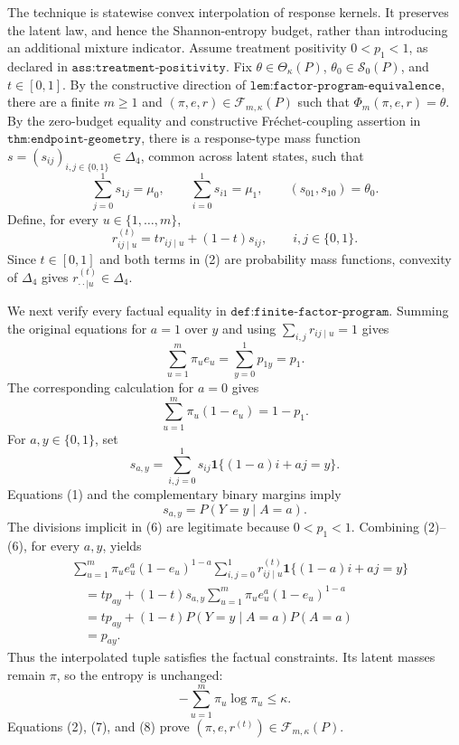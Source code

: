 The technique is statewise convex interpolation of response kernels.  It preserves the latent law, and hence the Shannon-entropy budget, rather than introducing an additional mixture indicator.  Assume treatment positivity \(0<p_1<1\), as declared in \(\texttt{ass:treatment-positivity}\).  Fix \(\theta\in\Theta_\kappa(P)\), \(\theta_0\in\mathcal S_0(P)\), and \(t\in[0,1]\).  By the constructive direction of \(\texttt{lem:factor-program-equivalence}\), there are a finite \(m\geq1\) and \((\pi,e,r)\in\mathcal F_{m,\kappa}(P)\) such that \(\Phi_m(\pi,e,r)=\theta\).  By the zero-budget equality and constructive Fréchet-coupling assertion in \(\texttt{thm:endpoint-geometry}\), there is a response-type mass function \(s=(s_{ij})_{i,j\in\{0,1\}}\in\Delta_4\), common across latent states, such that
\[
\sum_{j=0}^1s_{1j}=\mu_0,\qquad
\sum_{i=0}^1s_{i1}=\mu_1,\qquad
(s_{01},s_{10})=\theta_0.
\tag{1}
\]
Define, for every \(u\in\{1,\ldots,m\}\),
\[
r^{(t)}_{ij\mid u}=t r_{ij\mid u}+(1-t)s_{ij},
\qquad i,j\in\{0,1\}.
\tag{2}
\]
Since \(t\in[0,1]\) and both terms in (2) are probability mass functions, convexity of \(\Delta_4\) gives \(r^{(t)}_{\cdot\cdot\mid u}\in\Delta_4\).

We next verify every factual equality in \(\texttt{def:finite-factor-program}\).  Summing the original equations for \(a=1\) over \(y\) and using \(\sum_{i,j}r_{ij\mid u}=1\) gives
\[
\sum_{u=1}^m\pi_u e_u=\sum_{y=0}^1p_{1y}=p_1.
\tag{3}
\]
The corresponding calculation for \(a=0\) gives
\[
\sum_{u=1}^m\pi_u(1-e_u)=1-p_1.
\tag{4}
\]
For \(a,y\in\{0,1\}\), set
\[
s_{a,y}=\sum_{i,j=0}^1s_{ij}\mathbf 1\{(1-a)i+aj=y\}.
\tag{5}
\]
Equations (1) and the complementary binary margins imply
\[
s_{a,y}=P(Y=y\mid A=a).
\tag{6}
\]
The divisions implicit in (6) are legitimate because \(0<p_1<1\).  Combining (2)--(6), for every \(a,y\), yields
\[
\begin{aligned}
&\sum_{u=1}^m\pi_u e_u^a(1-e_u)^{1-a}
 \sum_{i,j=0}^1r^{(t)}_{ij\mid u}\mathbf 1\{(1-a)i+aj=y\}\\
&\quad=t p_{ay}+(1-t)s_{a,y}
 \sum_{u=1}^m\pi_u e_u^a(1-e_u)^{1-a}\\
&\quad=t p_{ay}+(1-t)P(Y=y\mid A=a)P(A=a)\\
&\quad=p_{ay}.
\end{aligned}
\tag{7}
\]
Thus the interpolated tuple satisfies the factual constraints.  Its latent masses remain \(\pi\), so the entropy is unchanged:
\[
-\sum_{u=1}^m\pi_u\log\pi_u\leq\kappa.
\tag{8}
\]
Equations (2), (7), and (8) prove \((\pi,e,r^{(t)})\in\mathcal F_{m,\kappa}(P)\).


